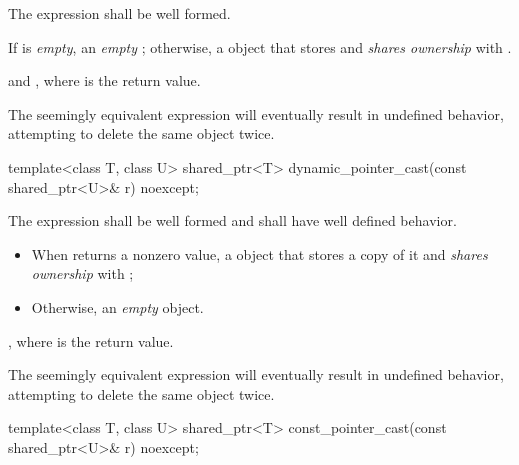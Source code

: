 \begin{itemdescr}
\pnum\requires  The expression  shall
be well formed.

\pnum\returns  If  is \textit{empty}, an \textit{empty}
; otherwise, a  object that
stores  and \textit{shares ownership}
with .

\pnum
\postconditions {} and
, where  is the return value.

\pnum
\enternote The seemingly equivalent expression
will eventually result in undefined behavior, attempting to delete the
same object twice. \exitnote
\end{itemdescr}

%
%
\begin{itemdecl}
template<class T, class U> shared_ptr<T> dynamic_pointer_cast(const shared_ptr<U>& r) noexcept;
\end{itemdecl}

\begin{itemdescr}
\pnum\requires  The expression 
shall be well formed and shall have well defined behavior.

\pnum\returns
\begin{itemize}
\item When  returns a nonzero value, a
   object that stores a copy of it and \textit{shares
  ownership} with ;

\item Otherwise, an \textit{empty}  object.
\end{itemize}

\pnum
\postcondition {}, where  is the return value.

\pnum \enternote  The seemingly equivalent expression
 will eventually result in
undefined behavior, attempting to delete the same object twice. \exitnote
\end{itemdescr}

%
%
\begin{itemdecl}
template<class T, class U> shared_ptr<T> const_pointer_cast(const shared_ptr<U>& r) noexcept;
\end{itemdecl}

